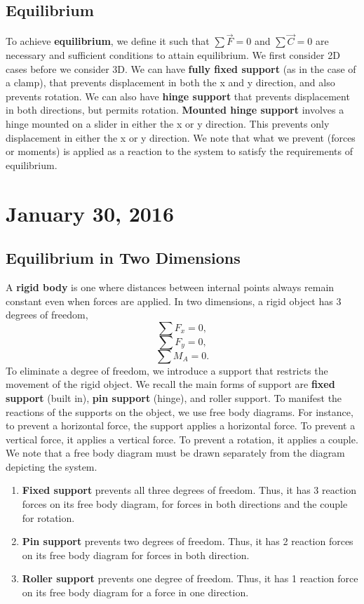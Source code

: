 \documentclass[11pt]{article}
\theoremstyle{plain} %
\theoremstyle{definition}
\theoremstyle{example}
\theoremstyle{remark}
\begin{document}
\subsection{Equilibrium}

To achieve \textbf{equilibrium}, we define it such that $\sum \vec{F} = 0$ and $\sum \vec{C} = 0$ are necessary and sufficient conditions to attain equilibrium. We first consider 2D cases before we consider 3D. We can have \textbf{fully fixed support} (as in the case of a clamp), that prevents displacement in both the x and y direction, and also prevents rotation. We can also have \textbf{hinge support} that prevents displacement in both directions, but permits rotation. \textbf{Mounted hinge support} involves a hinge mounted on a slider in either the x or y direction. This prevents only displacement in either the x or y direction. We note that what we prevent (forces or moments) is applied as a reaction to the system to satisfy the requirements of equilibrium. 

\section{January 30, 2016}
\subsection{Equilibrium in Two Dimensions}

A \textbf{rigid body} is one where distances between internal points always remain constant even when forces are applied. In two dimensions, a rigid object has 3 degrees of freedom, $$\sum F_x = 0,$$ $$\sum F_y = 0,$$  $$\sum M_A = 0.$$ To eliminate a degree of freedom, we introduce a support that restricts the movement of the rigid object. We recall the main forms of support are \textbf{fixed support} (built in), \textbf{pin support} (hinge), and roller support. To manifest the reactions of the supports on the object, we use free body diagrams. For instance, to prevent a horizontal force, the support applies a horizontal force. To prevent a vertical force, it applies a vertical force. To prevent a rotation, it applies a couple. We note that a free body diagram must be drawn separately from the diagram depicting the system. 

\begin{enumerate}
	\item \textbf{Fixed support} prevents all three degrees of freedom. Thus, it has 3 reaction forces on its free body diagram, for forces in both directions and the couple for rotation. 
	\item \textbf{Pin support} prevents two degrees of freedom. Thus, it has 2 reaction forces on its free body diagram for forces in both direction. 
	\item \textbf{Roller support} prevents one degree of freedom. Thus, it has 1 reaction force on its free body diagram for a force in one direction. 
\end{enumerate}
\end{document}
